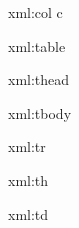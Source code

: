 
\startxmlsetups xml:col
	c
\stopxmlsetups

\startxmlsetups xml:table


	\starttabulate[|l|l|l|l|l|l|l|]
	\stoptabulate
\stopxmlsetups

\startxmlsetups xml:thead
\stopxmlsetups

\startxmlsetups xml:tbody
\stopxmlsetups

\startxmlsetups xml:tr
	\NC
	\NR
\stopxmlsetups

\startxmlsetups xml:th
	\bf {}
	\NC
\stopxmlsetups

\startxmlsetups xml:td
		{}
		{}
	\NC
\stopxmlsetups

